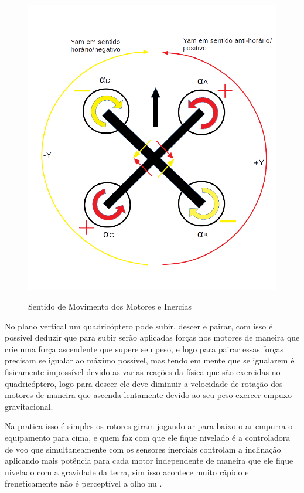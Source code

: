 \begin{figure}[htpb]
  \centering
  \caption{Sentido de Movimento dos Motores e Inercias}
  \includegraphics[scale=.3]{figs/rolldrone.png}
  \label{fig:rotationmot}
\end{figure}

No plano vertical um quadricóptero pode subir, descer e pairar, com isso é possível deduzir que para subir serão aplicadas forças nos motores de maneira que crie uma força ascendente que supere seu peso, e logo para pairar essas forças precisam se igualar ao máximo possível, mas tendo em mente que se igualarem é fisicamente impossível devido as varias reações da física que são exercidas no quadricóptero, logo para descer ele deve diminuir a velocidade de rotação dos motores de maneira que ascenda lentamente devido ao seu peso exercer empuxo gravitacional. 

Na pratica isso é simples os rotores giram jogando ar para baixo o ar empurra o equipamento para cima, e quem faz com que ele fique nivelado é a controladora de voo que simultaneamente com os sensores inerciais controlam a inclinação aplicando mais potência para cada motor independente de maneira que ele fique nivelado com a gravidade da terra, sim isso acontece muito rápido e freneticamente não é perceptível a olho nu \cite{forcecontrol}. 

